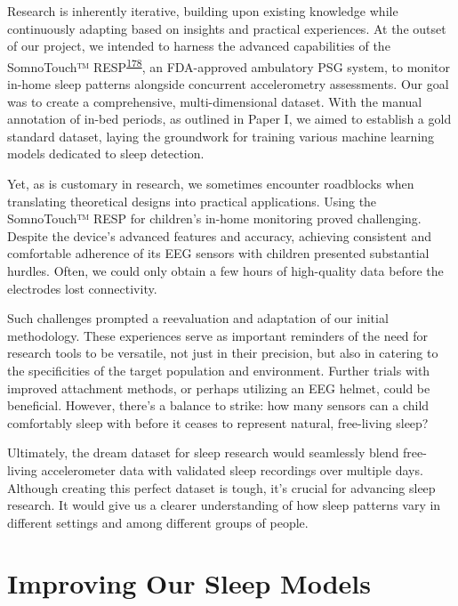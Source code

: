 \documentclass[
  10pt,
]{scrbook}
\begin{document}
Research is inherently iterative, building upon existing knowledge while
continuously adapting based on insights and practical experiences. At
the outset of our project, we intended to harness the advanced
capabilities of the SomnoTouch™️
RESP\textsuperscript{\protect\hyperlink{ref-somnotouch}{178}}, an
FDA-approved ambulatory PSG system, to monitor in-home sleep patterns
alongside concurrent accelerometry assessments. Our goal was to create a
comprehensive, multi-dimensional dataset. With the manual annotation of
in-bed periods, as outlined in Paper I, we aimed to establish a gold
standard dataset, laying the groundwork for training various machine
learning models dedicated to sleep detection.

Yet, as is customary in research, we sometimes encounter roadblocks when
translating theoretical designs into practical applications. Using the
SomnoTouch™️ RESP for children's in-home monitoring proved challenging.
Despite the device's advanced features and accuracy, achieving
consistent and comfortable adherence of its EEG sensors with children
presented substantial hurdles. Often, we could only obtain a few hours
of high-quality data before the electrodes lost connectivity.

Such challenges prompted a reevaluation and adaptation of our initial
methodology. These experiences serve as important reminders of the need
for research tools to be versatile, not just in their precision, but
also in catering to the specificities of the target population and
environment. Further trials with improved attachment methods, or perhaps
utilizing an EEG helmet, could be beneficial. However, there's a balance
to strike: how many sensors can a child comfortably sleep with before it
ceases to represent natural, free-living sleep?

Ultimately, the dream dataset for sleep research would seamlessly blend
free-living accelerometer data with validated sleep recordings over
multiple days. Although creating this perfect dataset is tough, it's
crucial for advancing sleep research. It would give us a clearer
understanding of how sleep patterns vary in different settings and among
different groups of people.

\hypertarget{improving-our-sleep-models}{%
\section{Improving Our Sleep Models}\label{improving-our-sleep-models}}
\end{document}
